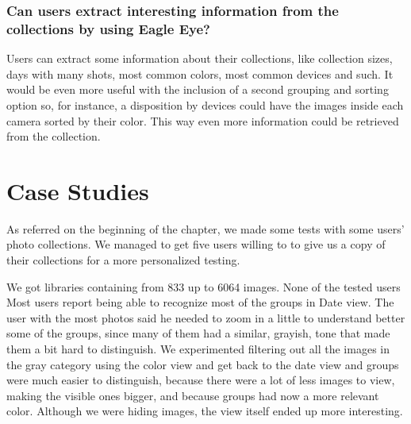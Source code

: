 \subsubsection{Can users extract interesting information from the collections by using Eagle Eye?}

Users can extract some information about their collections, like collection sizes, days with many shots, most common colors, most common devices and such. It would be even more useful with the inclusion of a second grouping and sorting option so, for instance, a disposition by devices could have the images inside each camera sorted by their color. This way even more information could be retrieved from the collection.





\section{Case Studies}

As referred on the beginning of the chapter, we made some tests with some users' photo collections. We managed to get five users willing to to give us a copy of their collections for a more personalized testing.

We got libraries containing from 833 up to 6064 images. None of the tested users  Most users report being able to recognize most of the  groups in Date view. The user with the most photos said he needed to zoom in a little to understand better some of the groups, since many of them had a similar, grayish, tone that made them a bit hard to distinguish. We experimented filtering out all the images in the gray category using the color view and get back to the date view and groups were much easier to distinguish, because there were a lot of less images to view, making the visible ones bigger, and because groups had now a more relevant color. Although we were hiding images, the view itself ended up more interesting.

